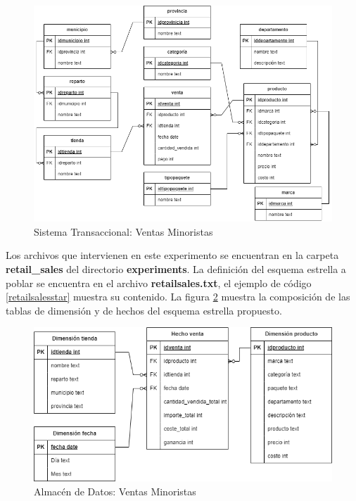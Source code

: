 \begin{figure}[H]
    \centering
    \includegraphics[scale=0.5]{Graphics/retailSales-Transactional.drawio.png}
    \caption{Sistema Transaccional: Ventas Minoristas}
    \label{fig:retail-transactional}
  \end{figure}

Los archivos que intervienen en este experimento se encuentran en la carpeta \textbf{retail\_sales} del 
directorio \textbf{experiments}. La definición del esquema estrella a poblar se encuentra en el archivo 
\textbf{retailsales.txt}, el ejemplo de código \ref{retailsalesstar} muestra su contenido. La figura \ref{fig:retail-Warehouse} muestra la composición de las 
tablas de dimensión y de hechos del esquema estrella propuesto. 

\begin{figure}[H]
  \centering
  \includegraphics[scale=0.5]{Graphics/retailSales-Data Warehouse.drawio.png}
  \caption{Almacén de Datos: Ventas Minoristas}
  \label{fig:retail-Warehouse}
\end{figure}

